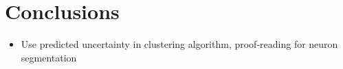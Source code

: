 
\section{Conclusions}
\begin{itemize}
\item Use predicted uncertainty in clustering algorithm, proof-reading for neuron segmentation 
\end{itemize}
